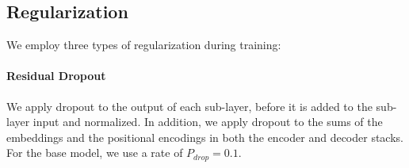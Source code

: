 \subsection{Regularization} \label{sec:reg}

We employ three types of regularization during training: 
\paragraph{Residual Dropout} We apply dropout \citep{srivastava2014dropout} to the output of each sub-layer, before it is added to the sub-layer input and normalized.   In addition, we apply dropout to the sums of the embeddings and the positional encodings in both the encoder and decoder stacks.  For the base model, we use a rate of $P_{drop}=0.1$.



